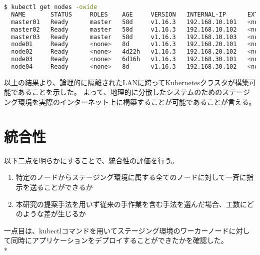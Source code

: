\begin{lstlisting}[language=bash]
  $ kubectl get nodes -owide
  NAME       STATUS     ROLES    AGE     VERSION   INTERNAL-IP      EXTERNAL-IP   OS-IMAGE             KERNEL-VERSION      CONTAINER-RUNTIME
  master01   Ready      master   58d     v1.16.3   192.168.10.101   <none>        Ubuntu 18.04.3 LTS   4.15.0-70-generic   docker://18.9.7
  master02   Ready      master   58d     v1.16.3   192.168.10.102   <none>        Ubuntu 18.04.3 LTS   4.15.0-70-generic   docker://18.9.7
  master03   Ready      master   58d     v1.16.3   192.168.10.103   <none>        Ubuntu 18.04.3 LTS   4.15.0-70-generic   docker://18.9.7
  node01     Ready      <none>   8d      v1.16.3   192.168.20.101   <none>        Ubuntu 18.04.3 LTS   4.15.0-74-generic   docker://18.9.7
  node02     Ready      <none>   4d22h   v1.16.3   192.168.20.102   <none>        Ubuntu 18.04.3 LTS   4.15.0-74-generic   docker://18.9.7
  node03     Ready      <none>   6d16h   v1.16.3   192.168.30.101   <none>        Ubuntu 18.04.3 LTS   4.15.0-74-generic   docker://18.9.7
  node04     Ready      <none>   8d      v1.16.3   192.168.30.102   <none>        Ubuntu 18.04.3 LTS   4.15.0-74-generic   docker://18.9.7
\end{lstlisting}

以上の結果より、論理的に隔離されたLANに跨ってKubernetesクラスタが構築可能であることを示した。
よって、地理的に分散したシステムのためのステージング環境を実際のインターネット上に構築することが可能であることが言える。

\section{統合性}
\label{evaluation:method}

以下二点を明らかにすることで、統合性の評価を行う。

\begin{enumerate}
  \item 特定のノードからステージング環境に属する全てのノードに対して一斉に指示を送ることができるか
  \item 本研究の提案手法を用いず従来の手作業を含む手法を選んだ場合、工数にどのような差が生じるか
\end{enumerate}

一点目は、kubectlコマンドを用いてステージング環境のワーカーノードに対して同時にアプリケーションをデプロイすることができたかを確認した。\\*

